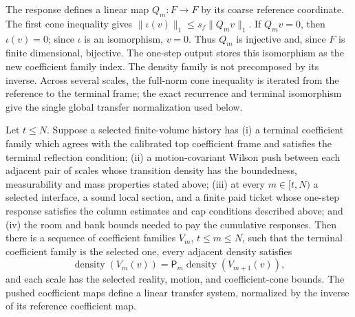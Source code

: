 The response defines a linear map $Q_m:F\to F$ by its coarse reference coordinate. The first cone inequality gives $\|\iota(v)\|_1\leq s_f\|Q_m v\|_1$. If $Q_m v=0$, then $\iota(v)=0$; since $\iota$ is an isomorphism, $v=0$. Thus $Q_m$ is injective and, since $F$ is finite dimensional, bijective. The one-step output stores this isomorphism as the new coefficient family index. The density family is not precomposed by its inverse. Across several scales, the full-norm cone inequality is iterated from the reference to the terminal frame; the exact recurrence and terminal isomorphism give the single global transfer normalization used below.

\begin{lemma}\label{ex-freight-backward}
Let $t\leq N$. Suppose a selected finite-volume history has (i) a terminal coefficient family which agrees with the calibrated top coefficient frame and satisfies the terminal reflection condition; (ii) a motion-covariant Wilson push between each adjacent pair of scales whose transition density has the boundedness, measurability and mass properties stated above; (iii) at every $m\in[t,N)$ a selected interface, a sound local section, and a finite paid ticket whose one-step response satisfies the column estimates and cap conditions described above; and (iv) the room and bank bounds needed to pay the cumulative responses. Then there is a sequence of coefficient families $V_m$, $t\leq m\leq N$, such that the terminal coefficient family is the selected one, every adjacent density satisfies
\[
 \operatorname{density}(V_m(v))=\mathsf P_m\operatorname{density}(V_{m+1}(v)),
\]
and each scale has the selected reality, motion, and coefficient-cone bounds. The pushed coefficient maps define a linear transfer system, normalized by the inverse of its reference coefficient map.
\end{lemma}

